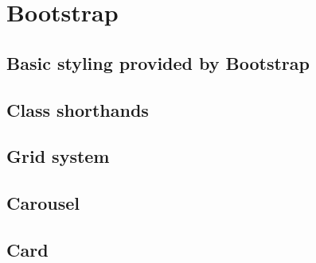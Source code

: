 \chapter{Bootstrap}

\section{Basic styling provided by Bootstrap}

\section{Class shorthands}

\section{Grid system}

\section{Carousel}

\section{Card}
\label{sec:cards}
